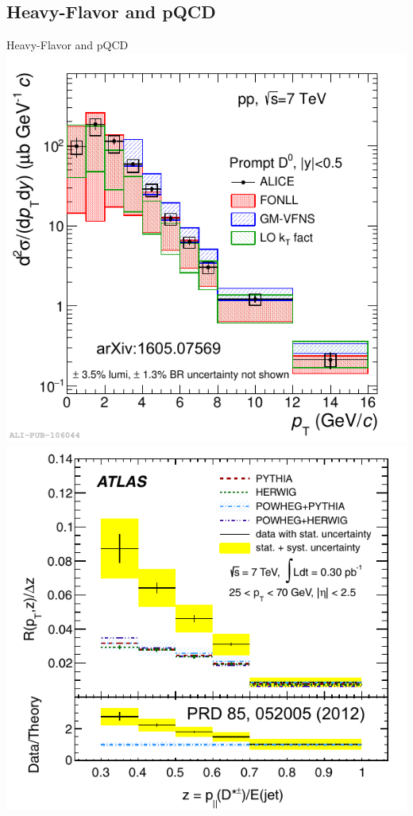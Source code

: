 \documentclass{beamer}
\begin{document}
\subsection{Heavy-Flavor and pQCD}
\begin{frame}{Heavy-Flavor and pQCD}
\centering
\includegraphics[width=.4\paperwidth]{img/ALICE_D0Meson}
\quad
\includegraphics[width=.42\paperwidth]{img/ATLAS_DStarJets}
\end{frame}
\end{document}
